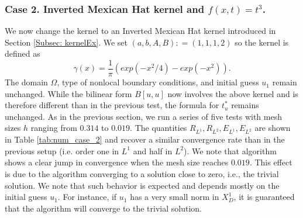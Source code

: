 \documentclass[11pt]{amsart}   	%
\theoremstyle{plain}
\numberwithin{equation}{section}
\newcommand{\LC}[1]{{\color{purple} {\bf Loic:} [#1] }}
\begin{document}
\subsubsection{Case 2. Inverted Mexican Hat kernel and $f(x,t)=t^3$.} \label{sec:num_case_2}
We now change the kernel to an Inverted Mexican Hat kernel introduced in Section \ref{Subsec: kernelEx}. We set $(a,b,A,B): =(1,1,1,2)$ so the kernel is defined as
$$\gamma(x) = \frac{1}{\pi}\left( exp(-x^2/4) - exp(-x^2) \right).$$
The domain $\Omega$, type of nonlocal boundary conditions, and initial guess $u_1$ remain unchanged.
While the bilinear form $B[u,u]$ now involves the above kernel and is therefore different than in the previous test, the formula for $t^*_u$ remains unchanged.
As in the previous section, we run a series of five tests with mesh sizes $h$ ranging from $0.314$ to $0.019$. The quantities $R_{L^1}, R_{L^2}, E_{L^1}, E_{L^2}$ are shown in Table \ref{tab:num_case_2} and recover a similar convergence rate than in the previous setup (i.e. order one in $L^1$ and half in $L^2$). 
We note that algorithm shows a clear jump in convergence when the mesh size reaches $0.019$. This effect is due to the algorithm converging to a solution close to zero, i.e., the trivial solution. We note that such behavior is expected and depends mostly on the initial guess $u_1$. For instance, if $u_1$ has a very small norm in $X_D^1$, it is guaranteed that the algorithm will converge to the trivial solution. 

\end{document}
